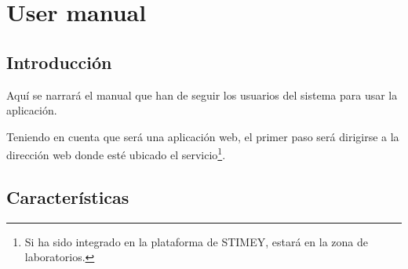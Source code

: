 \documentclass{book}
\newenvironment{changemargin}[2]{%
	\begin{list}{}{%
			\setlength{\topsep}{0pt}%
			\setlength{\leftmargin}{#1}%
			\setlength{\rightmargin}{#2}%
			\setlength{\listparindent}{\parindent}%
			\setlength{\itemindent}{\parindent}%
			\setlength{\parsep}{\parskip}%
		}%
		\item[]}{\end{list}}
\begin{document}
%
%
%	
%		
%		
%		
%		
%		
%		
%
%	
%
%
%	
%	
%

\newpage

%


\tableofcontents
\newpage
	
\chapter{User manual}
\section{Introducción}

Aquí se narrará el manual que han de seguir los usuarios del sistema para usar la aplicación.


Teniendo en cuenta que será una aplicación web, el primer paso será dirigirse a la dirección web donde esté ubicado el servicio\footnote{Si ha sido integrado en la plataforma de STIMEY, estará en la zona de laboratorios.}.


\section{Características}
\end{document}
